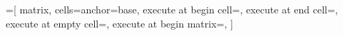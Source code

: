 %
%
%




=[%
   matrix,%
   cells={anchor=base},%
   execute at begin cell=\tikz@lib@matrix@start@cell,%
   execute at end cell=\tikz@lib@matrix@end@cell,%
   execute at empty cell=\tikz@lib@matrix@empty@cell,
   execute at begin matrix=\iftikz@handle@active@code\tikz@orig@shorthands\fi,%
]

\def\tikz@lib@matrix@empty@cell{\iftikz@lib@matrix@empty\node[name=\tikzmatrixname-\the\pgfmatrixcurrentrow-\the\pgfmatrixcurrentcolumn]{};\fi}

\newif\iftikz@lib@matrix@plain

\def\tikz@lib@matrix@start@cell{%
  \pgfutil@ifnextchar|{\tikz@lib@matrix@with@options}{\tikz@lib@matrix@normal@start@cell}}

\def\tikz@lib@matrix@with@options|#1|{\tikz@lib@matrix@plainfalse\node%
  [name=\tikzmatrixname-\the\pgfmatrixcurrentrow-\the\pgfmatrixcurrentcolumn]#1\bgroup\tikz@lib@matrix@startup}


\def\tikz@lib@matrix@normal@start@cell{\pgfutil@ifnextchar\let{\tikz@lib@matrix@check}{\tikz@lib@matrix@plainfalse\node
  [name=\tikzmatrixname-\the\pgfmatrixcurrentrow-\the\pgfmatrixcurrentcolumn]\bgroup\tikz@lib@matrix@startup}}%

\def\tikz@lib@matrix@check#1{%
  \pgfutil@ifnextchar\tikz@signal@path{\tikz@lib@matrix@plaintrue\let}{\tikz@lib@matrix@plainfalse\node
  [name=\tikzmatrixname-\the\pgfmatrixcurrentrow-\the\pgfmatrixcurrentcolumn]\bgroup\tikz@lib@matrix@startup\let}%
}
  
\def\tikz@lib@matrix@end@cell{%
  \iftikz@lib@matrix@plain%
  \else%
    \expandafter\egroup\expandafter;%
  \fi%
}

\def\tikz@lib@matrix@startup{%
  \pgfutil@ifnextchar\bgroup{%
    \let\tikz@lib@matrix@saved@eol=\\%
    \let\\=\pgfmatrixendrow%
    \afterassignment\tikz@lib@matrix@smuggle%
    \let\tikz@next}
  {\let\\=\pgfmatrixendrow}%
}
\def\tikz@lib@matrix@smuggle{%
  \bgroup%
  \let\\=\tikz@lib@matrix@saved@eol%
}


